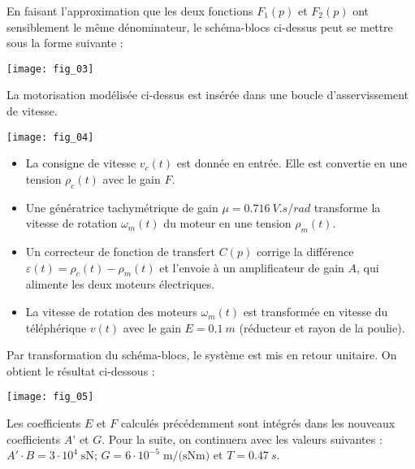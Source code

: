 En faisant l’approximation que les deux fonctions $F_1(p)$ et $F_2(p)$ ont sensiblement le même dénominateur, le schéma-blocs ci-dessus peut se mettre sous la forme suivante :
\begin{center}
	\texttt{[image: fig\_03]}
\end{center}



La motorisation modélisée ci-dessus est insérée dans une boucle d’asservissement de vitesse.

\begin{marginfigure}
	\texttt{[image: fig\_04]}
\end{marginfigure}

\begin{itemize}
\item La consigne de vitesse $v_c(t)$ est donnée en entrée. Elle est convertie en une tension $\rho_c(t)$ avec le gain $F$.
\item Une génératrice tachymétrique de gain $\mu=\SI{0.716}{V.s/rad}$ transforme la vitesse de rotation $\omega_m(t)$ du moteur en une tension $\rho_m(t)$.
\item Un correcteur de fonction de transfert $C(p)$ corrige la différence $\varepsilon(t)=\rho_c(t)- \rho_m(t)$ et l’envoie à un amplificateur de gain $A$, qui alimente les deux moteurs électriques.
\item La vitesse de rotation des moteurs $\omega_m(t)$ est transformée en vitesse du téléphérique $v(t)$ avec le gain $E=\SI{0,1}{m}$ (réducteur et rayon de la poulie).
\end{itemize}




Par transformation du schéma-blocs, le système est mis en retour unitaire. On obtient le résultat ci-dessous :
\begin{center}
	\texttt{[image: fig\_05]}
\end{center}

	Les coefficients $E$ et $F$ calculés précédemment sont intégrés dans les nouveaux coefficients $A’$ et $G$. Pour la suite, on continuera avec les valeurs suivantes : $A'\cdot B=3\cdot 10^{4}\;\text{sN}$; $G=6\cdot 10^{-5}\;\text{m/(sNm)}$ et $T=\SI{0,47}{s}$.
	
